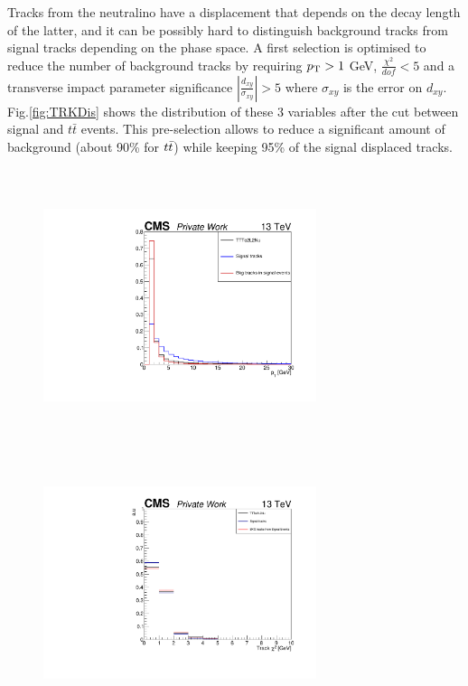 \documentclass{cernatlasnote}
\begin{document}
Tracks from the neutralino have a displacement that depends on the decay length of the latter, and it can be possibly hard to distinguish background tracks from signal tracks depending on the phase space. A first selection is optimised to reduce the number of background tracks by requiring $p_{\text T} > 1$ GeV, $\frac{\chi^2}{dof} < 5$ and a transverse impact parameter significance $|\frac{d_{xy}}{\sigma_{xy}}| > 5$ where  $\sigma_{xy}$ is the error on $d_{xy}$. Fig.\ref{fig:TRKDis} shows the distribution of these 3 variables after the cut between signal and $t\bar{t}$ events. This pre-selection allows to reduce a significant amount of background (about 90\% for $t\Bar{t}$) while keeping 95\% of the signal displaced tracks. \\

        \begin{figure}[ht]
        \centering
        \includegraphics[height=8cm, width=8cm, trim= 0cm 0cm 0cm 0cm,clip]{images/TRK/Pt_TT.pdf}
        \includegraphics[height=8cm, width=8cm, trim= 0cm 0cm 0cm 0cm,clip]{images/TRK/Track_chi2.pdf}

\end{figure}
\end{document}

